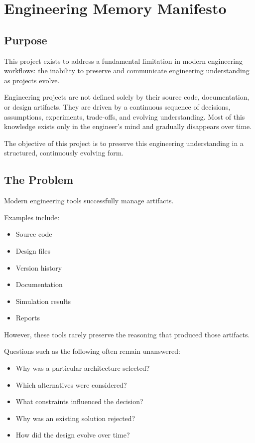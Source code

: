 \section{Engineering Memory Manifesto}

\subsection{Purpose}

This project exists to address a fundamental limitation in modern engineering workflows: the inability to preserve and communicate engineering understanding as projects evolve.

Engineering projects are not defined solely by their source code, documentation, or design artifacts. They are driven by a continuous sequence of decisions, assumptions, experiments, trade-offs, and evolving understanding. Most of this knowledge exists only in the engineer's mind and gradually disappears over time.

The objective of this project is to preserve this engineering understanding in a structured, continuously evolving form.

\vspace{0.5cm}

\subsection{The Problem}

Modern engineering tools successfully manage artifacts.

Examples include:

\begin{itemize}
    \item Source code
    \item Design files
    \item Version history
    \item Documentation
    \item Simulation results
    \item Reports
\end{itemize}

However, these tools rarely preserve the reasoning that produced those artifacts.

Questions such as the following often remain unanswered:

\begin{itemize}
    \item Why was a particular architecture selected?
    \item Which alternatives were considered?
    \item What constraints influenced the decision?
    \item Why was an existing solution rejected?
    \item How did the design evolve over time?
\end{itemize}

